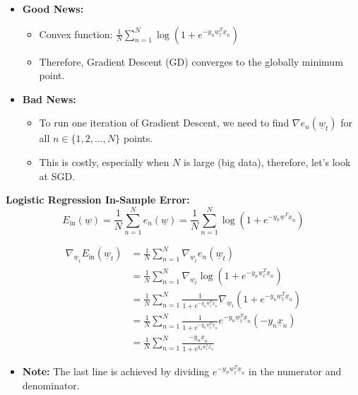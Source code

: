 \begin{intuition}
    \begin{itemize}
        \item \textbf{Good News:}
            \begin{itemize}[left=0pt]
                \item Convex function: $\frac{1}{N} \sum_{n=1}^{N} \log\left(1 + e^{-y_n \underline{w}_t^T \underline{x}_n}\right)$
                \item Therefore, Gradient Descent (GD) converges to the globally minimum point.
            \end{itemize}
        
        \item \textbf{Bad News:}
        \begin{itemize}[left=0pt]
            \item To run one iteration of Gradient Descent, we need to find \( \nabla e_n(\underline{w}_t) \) for all \( n \in \{1, 2, \dots, N\} \) points.
            \item This is costly, especially when \( N \) is large (big data), therefore, let's look at SGD.
        \end{itemize}
    \end{itemize}
\end{intuition}

\begin{derivation}
    \textbf{Logistic Regression In-Sample Error:}
    \[
    E_{\text{in}}(\underline{w}) = \frac{1}{N} \sum_{n=1}^{N} e_n(\underline{w}) = \frac{1}{N} \sum_{n=1}^{N} \log\left(1 + e^{-y_n \underline{w}^T \underline{x}_n}\right)
    \]

    \begin{align*}
        \nabla_{\underline{w}_t} E_{\text{in}}(\underline{w}_t) &= \frac{1}{N} \sum_{n=1}^{N} \nabla_{\underline{w}_t} e_n(\underline{w}_t) \\
        &= \frac{1}{N} \sum_{n=1}^{N} \nabla_{\underline{w}_t} \log\left(1 + e^{-y_n \underline{w}_t^T \underline{x}_n}\right) \\
        &= \frac{1}{N} \sum_{n=1}^{N} \frac{1}{1 + e^{-y_n \underline{w}_t^T \underline{x}_n}} \nabla_{\underline{w}_t} \left( 1 + e^{-y_n \underline{w}_t^T \underline{x}_n} \right) \\ 
        &= \frac{1}{N} \sum_{n=1}^{N} \frac{1}{1 + e^{-y_n \underline{w}_t^T \underline{x}_n}} e^{-y_n \underline{w}_t^T \underline{x}_n} (-y_n \underline{x}_n) \\
        &= \frac{1}{N} \sum_{n=1}^{N} \frac{-y_n \underline{x}_n}{1 + e^{y_n \underline{w}_t^T \underline{x}_n}} 
    \end{align*}
    \begin{itemize}
        \item \textbf{Note:} The last line is achieved by dividing $e^{-y_n \underline{w}_t^T \underline{x}_n}$ in the numerator and denominator. 
    \end{itemize}

\end{derivation}

